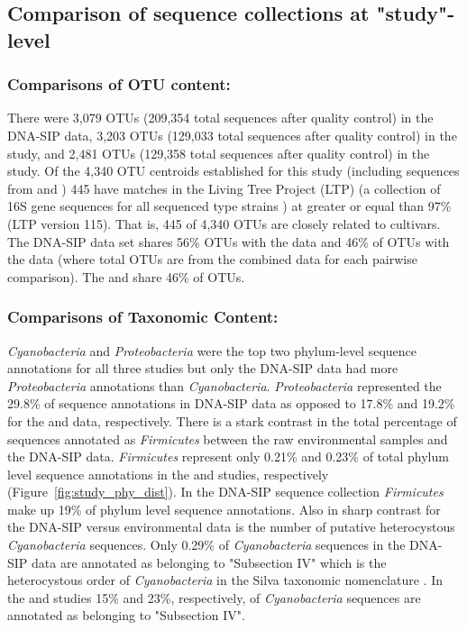 \subsection{Comparison of sequence collections at "study"-level}
\subsubsection{Comparisons of OTU content:} 
There were 3,079 OTUs (209,354 total sequences after quality control) in the
DNA-SIP data, 3,203 OTUs (129,033 total sequences after quality control) in the
\citet{Garcia_Pichel_2013} study, and 2,481 OTUs (129,358 total sequences after
quality control) in the \citet{Steven_2013} study. Of the 4,340 OTU centroids
established for this study (including sequences from \citet{Steven_2013} and
\citet{Garcia_Pichel_2013}) 445 have matches in the Living Tree Project (LTP)
(a collection of 16S gene sequences for all sequenced type strains
\citep{Yarza_2008}) at greater or equal than 97\% (LTP version 115). That is,
445 of 4,340 OTUs are closely related to cultivars. The DNA-SIP data set shares
56\% OTUs with the \citet{Steven_2013} data and 46\% of OTUs with the
\citet{Garcia_Pichel_2013} data (where total OTUs are from the combined data
for each pairwise comparison).  The \citet{Steven_2013} and
\citet{Garcia_Pichel_2013} share 46\% of OTUs.

\subsubsection{Comparisons of Taxonomic Content:} \textit{Cyanobacteria} and
\textit{Proteobacteria} were the top two phylum-level sequence annotations
for all three studies but only the DNA-SIP data had more
\textit{Proteobacteria} annotations than \textit{Cyanobacteria}.
\textit{Proteobacteria} represented the 29.8\% of sequence annotations in
DNA-SIP data as opposed to 17.8\% and 19.2\% for the \citet{Garcia_Pichel_2013}
and \citet{Steven_2013} data, respectively.  There is a stark contrast in the
total percentage of sequences annotated as \textit{Firmicutes} between the raw
environmental samples and the DNA-SIP data. \textit{Firmicutes} represent only
0.21\% and 0.23\% of total phylum level sequence annotations in the
\citet{Steven_2013} and \citet{Garcia_Pichel_2013} studies, respectively
(Figure~\ref{fig:study_phy_dist}). In the DNA-SIP sequence collection
\textit{Firmicutes} make up 19\% of phylum level sequence annotations. Also in
sharp contrast for the DNA-SIP versus environmental data is the number of
putative heterocystous \textit{Cyanobacteria} sequences. Only 0.29\% of
\textit{Cyanobacteria} sequences in the DNA-SIP data are annotated as belonging
to "Subsection IV" which is the heterocystous order of \textit{Cyanobacteria}
in the Silva taxonomic nomenclature \citep{17947321}. In the
\citet{Steven_2013} and \citet{Garcia_Pichel_2013} studies 15\% and 23\%,
respectively, of \textit{Cyanobacteria} sequences are annotated as belonging to
"Subsection
IV".  

